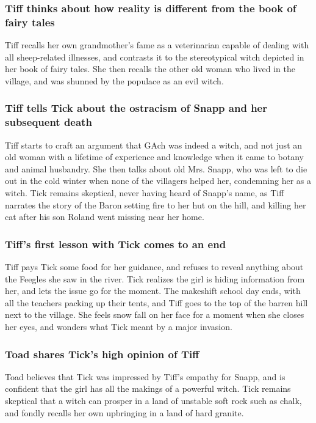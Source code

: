 \subsubsection{\Gls{Tiff} thinks about how reality is different from the book of fairy tales}
\Gls{Tiff} recalls her own grandmother's fame as a veterinarian capable of dealing with all
sheep-related illnesses, and contrasts it to the stereotypical witch depicted in her book of fairy
tales. She then recalls the other old woman who lived in the village, and was shunned by the
populace as an evil witch.

\subsubsection{\Gls{Tiff} tells \Gls{Tick} about the ostracism of \Gls{Snapp} and her subsequent
    death}
\Gls{Tiff} starts to craft an argument that \Gls{GAch} was indeed a witch, and not just an old
woman with a lifetime of experience and knowledge when it came to botany and animal husbandry.
She then talks about old Mrs. \Gls{Snapp}, who was left to die out in the cold winter when none of
the villagers helped her, condemning her as a witch. \Gls{Tick} remains skeptical, never having
heard of \Gls{Snapp}'s name, as \Gls{Tiff} narrates the story of the \Gls{Baron} setting fire to her
hut on the hill, and killing her cat after his son \Gls{Roland} went missing near her home.

\subsubsection{\Gls{Tiff}'s first lesson with \Gls{Tick} comes to an end}
\Gls{Tiff} pays \Gls{Tick} some food for her guidance, and refuses to reveal anything about the
Feegles she saw in the river. \Gls{Tick} realizes the girl is hiding information from her, and lets
the issue go for the moment. The makeshift school day ends, with all the teachers packing up their
tents, and \Gls{Tiff} goes to the top of the barren hill next to the village. She feels snow fall
on her face for a moment when she closes her eyes, and wonders what \Gls{Tick} meant by a major
invasion.

\subsubsection{\Gls{Toad} shares \Gls{Tick}'s high opinion of \Gls{Tiff}}
\Gls{Toad} believes that \Gls{Tick} was impressed by \Gls{Tiff}'s empathy for \Gls{Snapp}, and is
confident that the girl has all the makings of a powerful witch. \Gls{Tick} remains skeptical that
a witch can prosper in a land of unstable soft rock such as chalk, and fondly recalls her own
upbringing in a land of hard granite.

